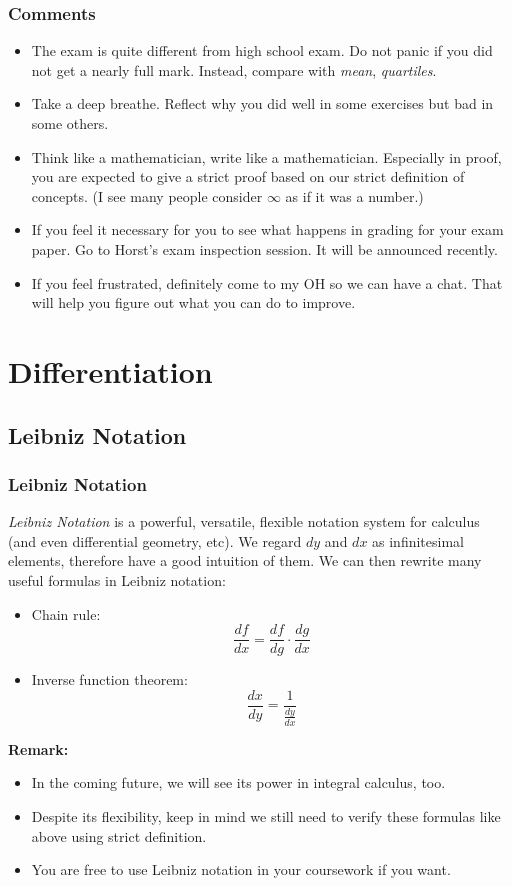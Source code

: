 \documentclass[10pt, t]{beamer}
\renewcommand{\emph}[1]{{\color{themecolor}\textsl{#1}}}
\begin{document}
\begin{frame}
    \frametitle{Comments}

    \begin{itemize}
        \item The exam is quite different from high school exam. Do not panic if you did not get a nearly full mark. Instead, compare with \emph{mean}, \emph{quartiles}.
        \item Take a deep breathe. Reflect why you did well in some exercises but bad in some others.
        \item Think like a mathematician, write like a mathematician. Especially in proof, you are expected to give a strict proof based on our strict definition of concepts. (I see many people consider $\infty$ as if it was a number.)
        \item If you feel it necessary for you to see what happens in grading for your exam paper. Go to Horst's exam inspection session. It will be announced recently.
        \item If you feel frustrated, definitely come to my OH so we can have a chat. That will help you figure out what you can do to improve.
    \end{itemize}
\end{frame}

\section{Differentiation}
\subsection{Leibniz Notation}
\begin{frame}
    \frametitle{Leibniz Notation}
    \emph{Leibniz Notation} is a powerful, versatile, flexible notation system for calculus (and even differential geometry, etc). We regard $dy$ and $dx$ as infinitesimal elements, therefore have a good intuition of them. We can then rewrite many useful formulas in Leibniz notation:
    \begin{itemize}
        \item Chain rule: $$\frac{d f}{d x}=\frac{d f}{d g} \cdot \frac{d g}{d x}$$
        \item Inverse function theorem: $$\frac{d x}{d y}=\frac{1}{\frac{d y}{d x}}$$
    \end{itemize}
    \textbf{Remark:}
    \begin{itemize}
        \item
              In the coming future, we will see its power in integral calculus, too.
        \item
              Despite its flexibility, keep in mind we still need to verify these formulas  like above using strict definition.
        \item
              You are free to use Leibniz notation in your coursework if you want.
    \end{itemize}
\end{frame}
\end{document}
